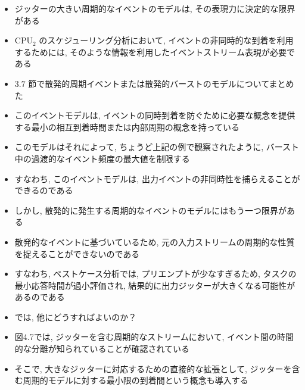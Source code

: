 \begin{frame}{}
    \begin{itemize}
        \item ジッターの大きい周期的なイベントのモデルは, その表現力に決定的な限界がある
        \item $\mathrm{CPU}_{2}$ のスケジューリング分析において, イベントの非同時的な到着を利用するためには, そのような情報を利用したイベントストリーム表現が必要である
        \item $3.7$ 節で散発的周期イベントまたは散発的バーストのモデルについてまとめた
        \item このイベントモデルは, イベントの同時到着を防ぐために必要な概念を提供する最小の相互到着時間または内部周期の概念を持っている
        \item このモデルはそれによって, ちょうど上記の例で観察されたように, バースト中の過渡的なイベント頻度の最大値を制限する
        \item すなわち, このイベントモデルは, 出力イベントの非同時性を捕らえることができるのである
    \end{itemize}
\end{frame}

\begin{frame}{}
    \begin{itemize}
        \item しかし, 散発的に発生する周期的なイベントのモデルにはもう一つ限界がある
        \item 散発的なイベントに基づいているため, 元の入力ストリームの周期的な性質を捉えることができないのである
        \item すなわち, ベストケース分析では, プリエンプトが少なすぎるため, タスクの最小応答時間が過小評価され, 結果的に出力ジッターが大きくなる可能性があるのである
        \item では, 他にどうすればよいのか？
    \end{itemize}
\end{frame}

\begin{frame}{}
    \begin{itemize}
        \item 図4.7では, ジッターを含む周期的なストリームにおいて, イベント間の時間的な分離が知られていることが確認されている
        \item そこで, 大きなジッターに対応するための直接的な拡張として, ジッターを含む周期的モデルに対する最小限の到着間という概念も導入する
    \end{itemize}
\end{frame}

